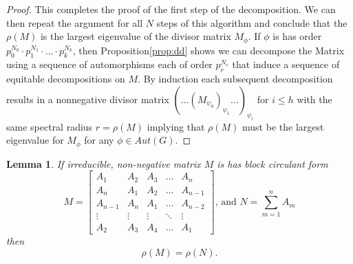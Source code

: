 \documentclass[preprint,12pt]{elsarticle}
\newtheorem{lem}[thm]{Lemma}
\theoremstyle{definition}
\theoremstyle{remark}
\begin{document}
\begin{proof}
This completes the proof of the first step of the decomposition.  We can then repeat the argument for all $N$ steps of this algorithm and conclude that the $\rho(M)$ is the largest eigenvalue of the divisor matrix $M_\phi$.  If $\phi$ is has order $p_0^{N_0}\cdot p_1^{N_1}\cdot\dots\cdot p_k^{N_k}$, then Proposition\ref{prop:dd} shows we can decompose the Matrix using a sequence of automorphisms each of order $p_r^{N_r}$ that induce a sequence of equitable decompositions on $M$. By induction each subsequent decomposition results in a nonnegative divisor matrix $(\dots(M_{\psi_0})_{\psi_1}\dots)_{\psi_i}$ for $i\leq h$ with the same spectral radius $r=\rho(M)$ implying that $\rho(M)$ must be the largest eigenvalue for $M_\phi$ for any $\phi\in Aut(G).$
\end{proof}


\begin{lem}\label{lem:bc}
If irreducible, non-negative matrix $M$ is has block circulant form
$$M=\left[\begin{matrix}
A_1 & A_2 & A_3 & \dots & A_n \\
A_n & A_1 & A_2 & \dots & A_{n-1}\\
A_{n-1} & A_n & A_1 & \dots & A_{n-2}\\
\vdots & \vdots & \vdots & \ddots & \vdots\\
A_2 & A_3 & A_4 & \dots & A_1\end{matrix}\right]\text{,  and   } N=\sum_{m=1}^n A_m$$ then $$\rho(M)=\rho(N).$$
\end{lem}
\end{document}
